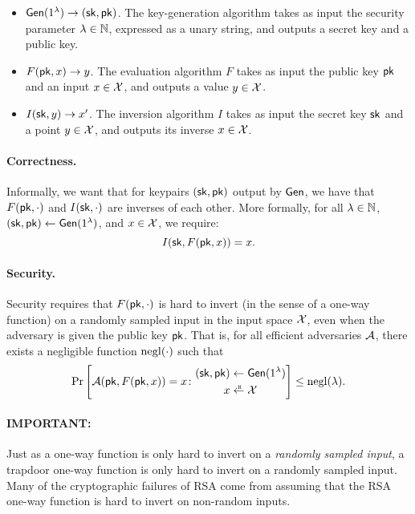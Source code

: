 \begin{itemize}
  \item $\mathsf{Gen}(1^\lambda) \to ({\mathsf{sk}}, \mathsf{pk})$.
        The key-generation algorithm takes as input the security parameter $\lambda \in \mathbb{N}$,
        expressed as a unary string, and outputs a secret key and a public key.
  \item $F(\mathsf{pk}, x) \to y$.
        The evaluation algorithm $F$ takes as input the
        public key $\mathsf{pk}$ and an input $x \in \mathcal{X}$, and outputs 
        a value $y \in \mathcal{X}$.
  \item $I({\mathsf{sk}}, y) \to x'$.
        The inversion algorithm $I$ takes as input the secret key ${\mathsf{sk}}$
        and a point $y \in \mathcal{X}$, and outputs its inverse $x \in \mathcal{X}$.
\end{itemize}

\paragraph{Correctness.}
Informally, we want that for keypairs $({\mathsf{sk}}, \mathsf{pk})$ output by $\mathsf{Gen}$,
we have that $F(\mathsf{pk}, \cdot)$ and $I({\mathsf{sk}}, \cdot)$ are inverses of each other.
More formally, for all $\lambda \in \mathbb{N}$, $({\mathsf{sk}}, \mathsf{pk}) \gets \mathsf{Gen}(1^\lambda)$, and $x \in \mathcal{X}$,
we require:
\[ I({\mathsf{sk}}, F(\mathsf{pk}, x))= x.\]

\paragraph{Security.}
Security requires that $F(\mathsf{pk}, \cdot)$ is hard to invert (in the sense of a one-way function)
on a randomly sampled input in the input space $\mathcal{X}$, even when the adversary 
is given the public key $\mathsf{pk}$.
That is, for all efficient adversaries $\mathcal{A}$, there exists a negligible function $\operatorname{negl}(\cdot)$
such that 
\[ \Pr\left[ 
\calA(\pk, F(\pk, x)) = x
\colon \begin{aligned}
  (\sk, \pk) &\gets \Gen(1^\lambda)\\
  x &\getsr \calX
\end{aligned}\right] \leq \negl(\lambda).\]


\paragraph{\textbf{IMPORTANT}:}
Just as a one-way function is only hard to invert on a \emph{randomly sampled input},
a trapdoor one-way function is only hard to invert on a randomly sampled input.
Many of the cryptographic failures of RSA come from assuming that the RSA
one-way function is hard to invert on non-random inputs.


